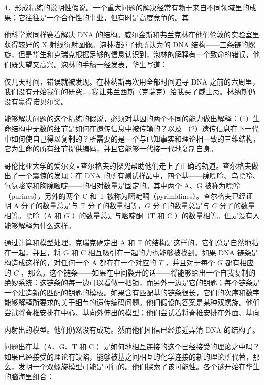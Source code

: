 4．形成精练的说明性假说。一个重大问题的解决经常有赖于来自不同领域里的成果；它往往是一个合作性的事业，但有时是高度竞争的。其

他科学家同样赛着解决 DNA 的结构。威尔金斯和弗兰克林在他们伦敦的实验室里获得较好的 X 射线衍射图像。泡林描述了他所认为的 DNA 结构——三条链的螺旋，但是华生和克瑞克根据足够的信息认识到，泡林的解释有一个致命的错误，他们既失望又高兴。泡林的手稿一经发表，华生写道：

\begin{displayquote}
仅几天时间，错误就被发现。在林纳斯再次用全部时间追寻 DNA 之前的六周里，我们没有开始我们的研究……我让弗兰西斯（克瑞克）给我买了威士忌。林纳斯仍没有赢得诺贝尔奖。\cite{watson1968d}
\end{displayquote}

能够解决问题的这个精练的假说，必须对基因的两个不同的能力做出解释：（1）生命结构中无数的细节是如何在遗传信息中被传输的？以及 （2）遗传信息在下一代中如何使自己得以复制的？所需要的是一个与已知事实和理论相一致的三维结构，它为生命的所有细节提供编码，并且它能够一代接一代地复制自身。

哥伦比亚大学的爱尔文•查尔格夫的探究帮助他们走上了正确的轨道。查尔格夫做出了一个震惊的发现：在 DNA 的所有测试样品中，四个基——腺嘌呤、乌嘌呤、氧氨嘧啶和胸腺嘧啶——的相对数量是固定的。其中两个 $\mathrm{A} 、 \mathrm{G}$ 被称为嘌呤（purines），另外的两个 C 和 T 被称为嘧啶酮（pyrimidines）。查尔格夫已经证明 A 分子的数量总是与 T 分子的数量相等，$G$ 分子的数量总是与 $C$ 分子的数量相等。嘌呤（A 和 $G$ ）的数量总是与嘧啶酮（T 和 C ）的数量相等。但是没有人能够解释为什么这样。

通过计算和模型处理，克瑞克确定出 A 和 T 的结构是这样的，它们总是自然地粘在一起，并且，将 G 和 C 相互吸引在一起的力也能够被找到。如果 DNA 链条是构造成这样的，对任何一个 A 都存在一个对应的 $T$ ，并且对于每个 $G$ 都有相应的 $C$ ，那么，这个链条——如果在中间裂开的话——将能够给出一个自我复制的绝妙系统：这链条的每一边可以看做一把锁，而另外一边是它的钥匙；每个链条是一个建造新的匹配的钥匙的模板。如果含有匹配基的链条很长，它们的次序和数字能够解释所要求的关于细节的遗传编码问题。他们假设的答案是某种双螺旋。他们尝试将脊椎安排在中心、基向外伸出的模型；他们尝试着将脊椎安排在外面、基向

内射出的模型。他们仍然没有成功。然而他们相信已经接近弄清 DNA 的结构了。

问题出在基（A、G、T 和 C ）是如何地相互连接的这个已经接受的理论之中吗？如果已经接受的理论有缺陷，能够被基之间相互的化学连接的新的理论所代替，那么，发明一个双螺旋模型可能是可行的。他们探索了该可能性。各个谜开始在华生的脑海里组合：

